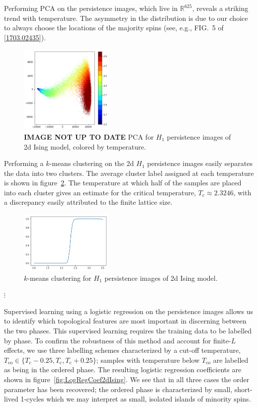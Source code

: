 \documentclass[11pt]{article}
\begin{document}
Performing PCA on the persistence images, which live in $\mathbb{R}^{625}$, reveals a striking trend with temperature. The asymmetry in the distribution is due to our choice to always choose the locations of the majority spins (see, e.g., FIG.~5 of [\href{https://arxiv.org/pdf/1703.02435.pdf}{1703.02435}]).

\begin{figure}[h]
	\centering
	\includegraphics[width=0.4\textwidth]{ising_images/pca_2d_ising}
	\caption{\textbf{IMAGE NOT UP TO DATE} PCA for $H_1$ persistence images of 2d Ising model, colored by temperature.}
	\label{}
\end{figure}

Performing a $k$-means clustering on the 2d $H_1$ persistence images easily separates the data into two clusters. The average cluster label assigned at each temperature is shown in figure~\ref{fig:kMeansAve2dIsing}. The temperature at which half of the samples are placed into each cluster gives an estimate for the critical temperature, $T_\text{c}\approx 2.3246$, with a discrepancy easily attributed to the finite lattice size.

\begin{figure}[h]
	\centering
	\includegraphics[width=0.4\textwidth]{ising_images/kmeans_avg_2d_ising}
	\caption{$k$-means clustering for $H_1$ persistence images of 2d Ising model.}
	\label{fig:kMeansAve2dIsing}
\end{figure}

$\vdots$

Supervised learning using a logistic regression on the persistence images allows us to identify which topological features are most important in discerning between the two phases. This supervised learning requires the training data to be labelled by phase. To confirm the robustness of this method and account for finite-$L$ effects, we use three labelling schemes characterized by a cut-off temperature, $T_\text{co}\in \{T_\text{c}-0.25,T_\text{c},T_\text{c}+0.25\}$; samples with temperature below $T_\text{co}$ are labelled as being in the ordered phase. The resulting logistic regression coefficients are shown in figure~\ref{fig:LogRegCoef2dIsing}. We see that in all three cases the order parameter has been recovered; the ordered phase is characterized by small, short-lived 1-cycles which we may interpret as small, isolated islands of minority spins.
\end{document}
